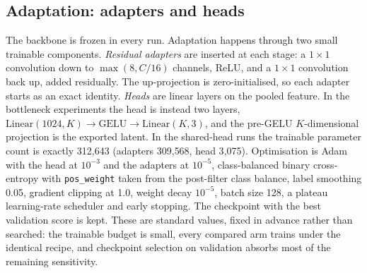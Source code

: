 \subsection{Adaptation: adapters and heads}
The backbone is frozen in every run. Adaptation happens through two small trainable components. \emph{Residual adapters} are inserted at each stage: a $1\times1$ convolution down to $\max(8, C/16)$ channels, ReLU, and a $1\times1$ convolution back up, added residually. The up-projection is zero-initialised, so each adapter starts as an exact identity. \emph{Heads} are linear layers on the pooled feature. In the bottleneck experiments the head is instead two layers, $\mathrm{Linear}(1024,K)\to\mathrm{GELU}\to\mathrm{Linear}(K,3)$, and the pre-GELU $K$-dimensional projection is the exported latent. In the shared-head runs the trainable parameter count is exactly 312{,}643 (adapters 309{,}568, head 3{,}075).  Optimisation is Adam with the head at $10^{-3}$ and the adapters at $10^{-5}$, class-balanced binary cross-entropy with \texttt{pos\_weight} taken from the post-filter class balance, label smoothing 0.05, gradient clipping at 1.0, weight decay $10^{-5}$, batch size 128, a plateau learning-rate scheduler and early stopping. The checkpoint with the best validation score is kept. These are standard values, fixed in advance rather than searched: the trainable budget is small, every compared arm trains under the identical recipe, and checkpoint selection on validation absorbs most of the remaining sensitivity. 

